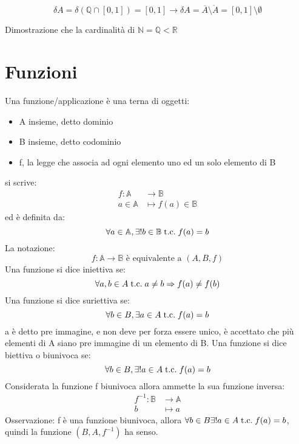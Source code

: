 \documentclass[a4paper,12pt]{article}
\begin{document}
	 \[\delta A = \delta (\mathbb{Q} \cap [0,1]) = [0,1] \rightarrow \delta A = \overline{A} \setminus \mathring{A} = [0,1] \setminus \emptyset\]
	 
	 Dimostrazione che la cardinalità di $\mathbb{N} = \mathbb{Q} < \mathbb{R}$
	 
	 \section{Funzioni}
	 Una funzione/applicazione è una terna di oggetti:
	 \begin{itemize}
	 	\item A insieme, detto dominio
	 	\item B insieme, detto codominio
	 	\item f, la legge che associa ad ogni elemento uno ed un solo elemento di B
	 \end{itemize}
	 si scrive:
	 \begin{align*}
	 	f: \mathbb{A} & \longrightarrow \mathbb{B} \\
	 	a \in \mathbb{A} & \longmapsto f(a) \in \mathbb{B}
	 \end{align*}
	 ed è definita da:
	 \[\forall a \in \mathbb{A}, \exists ! b \in \mathbb{B} \;\text{t.c.}\; f(a) = b\]
	 La notazione: \[f: \mathbb{A} \longrightarrow \mathbb{B} \text{ è equivalente a } (A, B, f)\]
	 Una funzione si dice iniettiva se:
	 \[\forall a,b \in A \;\text{t.c.}\; a \not = b \Rightarrow f(a) \not = f(b)\]
	 Una funzione si dice suriettiva se:
	 \[\forall b \in B, \exists a \in A \;\text{t.c.}\; f(a) = b\]
	 a è detto pre immagine, e non deve per forza essere unico, è accettato che più elementi di A siano pre immagine di un elemento di B.\newline
	 Una funzione si dice biettiva o biunivoca se:
	 \[\forall b \in B, \exists ! a \in A \;\text{t.c.}\; f(a) = b\]
	 Considerata la funzione f biunivoca allora ammette la sua funzione inversa:
	 \begin{align*}
	 	f^{-1}: \mathbb{B} & \longrightarrow \mathbb{A} \\
	 	b & \longmapsto a
	 \end{align*}
	 Osservazione: f è una funzione biunivoca, allora $\forall b \in B \exists ! a \in A \;\text{t.c.}\; f(a) = b$, quindi la funzione $(B, A, f^{-1})$ ha senso.
	 
\end{document}
